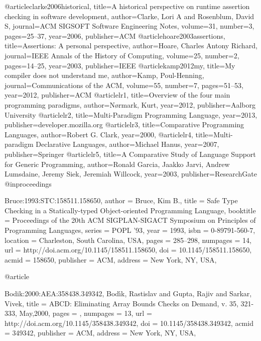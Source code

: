 \documentclass{sig-alternate}
\begin{document}
	\begin{thebibliography}{9}
		\bibitem @article{clarke2006historical,
			title={A historical perspective on runtime assertion checking in software development},
			author={Clarke, Lori A and Rosenblum, David S},
			journal={ACM SIGSOFT Software Engineering Notes},
			volume={31},
			number={3},
			pages={25--37},
			year={2006},
			publisher={ACM}
		}
		\bibitem @article{hoare2003assertions,
			title={Assertions: A personal perspective},
			author={Hoare, Charles Antony Richard},
			journal={IEEE Annals of the History of Computing},
			volume={25},
			number={2},
			pages={14--25},
			year={2003},
			publisher={IEEE}
		}
		\bibitem @article{kamp2012my,
			title={My compiler does not understand me},
			author={Kamp, Poul-Henning},
			journal={Communications of the ACM},
			volume={55},
			number={7},
			pages={51--53},
			year={2012},
			publisher={ACM}
		}
		\bibitem @article{lr1,
			title={Overview of the four main programming paradigms},
			author={Nørmark, Kurt},
			year={2012},
			publisher={Aalborg University}
		}
		\bibitem @article{lr2,
			title={Multi-Paradigm Programming Language},
			year={2013},
			publisher={developer.mozilla.org}
		}
		\bibitem @article{lr3,
			title={Comparative Programming Languages},
			author={Robert G. Clark},
			year={2000},
		}
		\bibitem @article{lr4,
			title={Multi-paradigm Declarative Languages},
			author={Michael Hanus},
			year={2007},
			publisher={Springer}
		}
		\bibitem @article{lr5,
			title={A Comparative Study of Language Support for Generic Programming},
			author={Ronald Garcia, Jaakko Jarvi, Andrew Lumsdaine, Jeremy Siek, Jeremiah Willcock},
			year={2003},
			publisher={ResearchGate}
		}
		\bibitem @inproceedings{Bruce:1993:STC:158511.158650,
			author = {Bruce, Kim B.},
			title = {Safe Type Checking in a Statically-typed Object-oriented Programming Language},
			booktitle = {Proceedings of the 20th ACM SIGPLAN-SIGACT Symposium on Principles of Programming Languages},
			series = {POPL '93},
			year = {1993},
			isbn = {0-89791-560-7},
			location = {Charleston, South Carolina, USA},
			pages = {285--298},
			numpages = {14},
			url = {http://doi.acm.org/10.1145/158511.158650},
			doi = {10.1145/158511.158650},
			acmid = {158650},
			publisher = {ACM},
			address = {New York, NY, USA},
			
			\bibitem @article{Bodik:2000:AEA:358438.349342, Bod\'{\i}k, Rastislav and Gupta, Rajiv and Sarkar, Vivek,
				title = {ABCD: Eliminating Array Bounds Checks on Demand},
				v. 35, 321-333, May,2000,
				pages = {},
				numpages = {13},
				url = {http://doi.acm.org/10.1145/358438.349342},
				doi = {10.1145/358438.349342},
				acmid = {349342},
				publisher = {ACM},
				address = {New York, NY, USA},
				
}}
\end{thebibliography}
\end{document}
